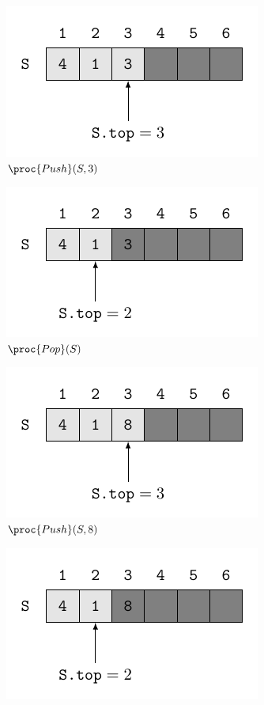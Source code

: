\begin{description}
\begin{ex}
\begin{figure}[H]
      \begin{subfigure}[t]{.45\textwidth}
        \centering
        \includegraphics[scale=1]{img/10_1-1/10_1-1_3.pdf}
        \caption{$\proc{Push}(S,3)$}\label{fig:10_1-1_3}
      \end{subfigure}
      \begin{subfigure}[t]{.45\textwidth}
        \centering
        \includegraphics[scale=1]{img/10_1-1/10_1-1_4.pdf}
        \caption{$\proc{Pop}(S)$}\label{fig:10_1-1_4}
      \end{subfigure}
      \begin{subfigure}[t]{.45\textwidth}
        \centering
        \includegraphics[scale=1]{img/10_1-1/10_1-1_5.pdf}
        \caption{$\proc{Push}(S,8)$}\label{fig:10_1-1_5}
      \end{subfigure}
      \begin{subfigure}[t]{.45\textwidth}
        \centering
        \includegraphics[scale=1]{img/10_1-1/10_1-1_6.pdf}

\end{subfigure}
\end{figure}
\end{ex}
\end{description}
